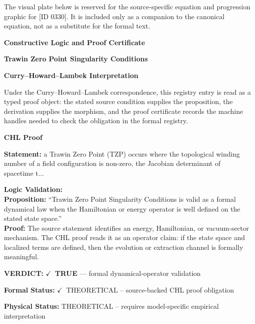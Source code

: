 \begingroup\footnotesize\sloppy
The visual plate below is reserved for the source-specific equation and progression graphic for [ID 0330]. It is included only as a companion to the canonical equation, not as a substitute for the formal text.
\par\endgroup
\ifTZPDarkEdition
{}
\fi

\clearpage
\begingroup\tzpsupportsetup
\noindent\textbf{\fontsize{10.8pt}{12.8pt}\selectfont [ID 0330] Constructive Logic and Proof Certificate}\par
\noindent\textbf{\fontsize{10pt}{12pt}\selectfont Trawin Zero Point Singularity Conditions}\par
\vspace{0.45em}
\begingroup
\footnotesize
\setlength{\parskip}{0.22em}
\setlength{\parindent}{0pt}
\noindent\textbf{Curry--Howard--Lambek Interpretation}\par
Under the Curry--Howard--Lambek correspondence, this registry entry is read as a typed proof
object: the stated source condition supplies the proposition, the derivation supplies the
morphism, and the proof certificate records the machine handles needed to check the obligation
in the formal registry.

\vspace{0.45em}
\noindent\textbf{CHL Proof}\par
\textbf{Statement:} a Trawin Zero Point (TZP) occurs where the topological winding number of a field
configuration is non-zero, the Jacobian determinant of spacetime t...

\textbf{Logic Validation:}\\
\textbf{Proposition:} ``Trawin Zero Point Singularity Conditions is valid as a formal dynamical law when the
Hamiltonian or energy operator is well defined on the stated state space.''\\
\textbf{Proof:} The source statement identifies an energy, Hamiltonian, or vacuum-sector mechanism. The
CHL proof reads it as an operator claim: if the state space and localized terms are
defined, then the evolution or extraction channel is formally meaningful.

\textbf{VERDICT:} \ensuremath{\checkmark}\ \textbf{TRUE} --- formal dynamical-operator validation

\textbf{Formal Status:} \ensuremath{\checkmark}\ THEORETICAL -- source-backed CHL proof obligation

\textbf{Physical Status:} THEORETICAL -- requires model-specific empirical interpretation
\par\vspace{0.45em}
\par
\ifTZPDarkEdition
{}
\fi
\endgroup
\endgroup
